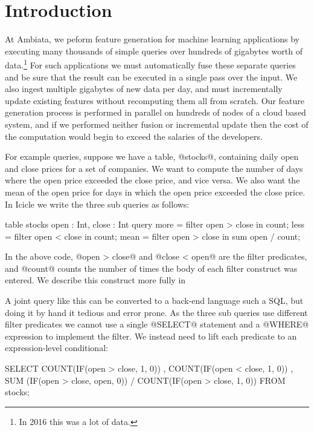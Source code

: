 \section{Introduction}
\label{s:Introduction}

At Ambiata, we peform feature generation for machine learning applications by executing many thousands of simple queries over hundreds of gigabytes worth of data.\footnote{In 2016 this was a lot of data.} For such applications we must automatically fuse these separate queries and be sure that the result can be executed in a single pass over the input. We also ingest multiple gigabytes of new data per day, and must incrementally update existing features without recomputing them all from scratch. Our feature generation process is performed in parallel on hundreds of nodes of a cloud based system, and if we performed neither fusion or incremental update then the cost of the computation would begin to exceed the salaries of the developers.

For example queries, suppose we have a table, @stocks@, containing daily open and close prices for a set of companies. We want to compute the number of days where the open price exceeded the close price, and vice versa. We also want the mean of the open price for days in which the open price exceeded the close price. In Icicle we write the three sub queries as follows:

\begin{code}
table stocks { open : Int, close : Int }
query 
  more  = filter open > close in count;
  less  = filter open < close in count;
  mean  = filter open > close in sum open / count;
\end{code}
In the above code, @open > close@ and @close < open@ are the filter predicates, and @count@ counts the number of times the body of each filter construct was entered. We describe this construct more fully in \REF

A joint query like this can be converted to a back-end language such a SQL, but doing it by hand it tedious and error prone. As the three sub queries use different filter predicates we cannot use a single @SELECT@ statement and a @WHERE@ expression to implement the filter. We instead need to lift each predicate to an expression-level conditional:
%
\begin{code}
  SELECT COUNT(IF(open > close, 1, 0))
       , COUNT(IF(open < close, 1, 0))
       , SUM  (IF(open > close, open, 0))
       / COUNT(IF(open > close, 1, 0))
  FROM stocks;
\end{code}

